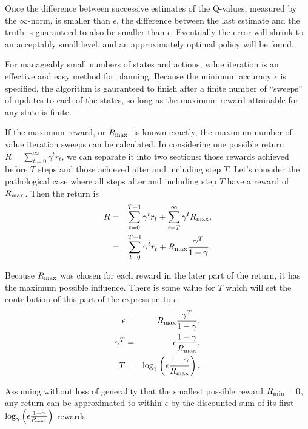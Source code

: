 Once the difference between successive estimates of the Q-values, measured by the $\infty$-norm, is smaller than $\epsilon$, the difference between the last estimate and the truth is guaranteed to also be smaller than $\epsilon$. Eventually the error will shrink to an acceptably small level, and an approximately optimal policy will be found.

For manageably small numbers of states and actions, value iteration is an effective and easy method for planning. Because the minimum accuracy $\epsilon$ is specified, the algorithm is gauranteed to finish after a finite number of ``sweeps'' of updates to each of the states, so long as the maximum reward attainable for any state is finite.

If the maximum reward, or $R_{\rm max}$, is known exactly, the maximum number of value iteration sweeps can be calculated.  In considering one possible return $R=\sum_{t=0}^\infty \gamma^t r_t$, we can separate it into two sections: those rewards achieved before $T$ steps and those achieved after and including step $T$. Let's consider the pathological case where all steps after and including step $T$ have a reward of $R_{\rm max}$. Then the return is
\begin{eqnarray}
R &=& \sum_{t=0}^{T-1} \gamma^t r_t + \sum_{t=T}^\infty \gamma^t R_{\rm max},\\
&=& \sum_{t=0}^{T-1} \gamma^t r_t + R_{\rm max} \frac{\gamma^T}{1-\gamma}.
\end{eqnarray}

Because $R_{\rm max}$ was chosen for each reward in the later part of the return, it has the maximum possible influence. There is some value for $T$ which will set the contribution of this part of the expression to $\epsilon$.
\begin{eqnarray}
\epsilon &=& R_{\rm max} \frac{\gamma^T}{1-\gamma},\\
{\gamma^T} &=& \epsilon \frac {1-\gamma} {R_{\rm max}},\\
T &=& \log_\gamma\left(\epsilon \frac {1-\gamma} {R_{\rm max}}\right).
\end{eqnarray}

Assuming without loss of generality that the smallest possible reward $R_{\rm min}=0$, any return can be approximated to within $\epsilon$ by the discounted sum of its first $\log_\gamma\left(\epsilon \frac {1-\gamma} {R_{\rm max}}\right)$ rewards.

